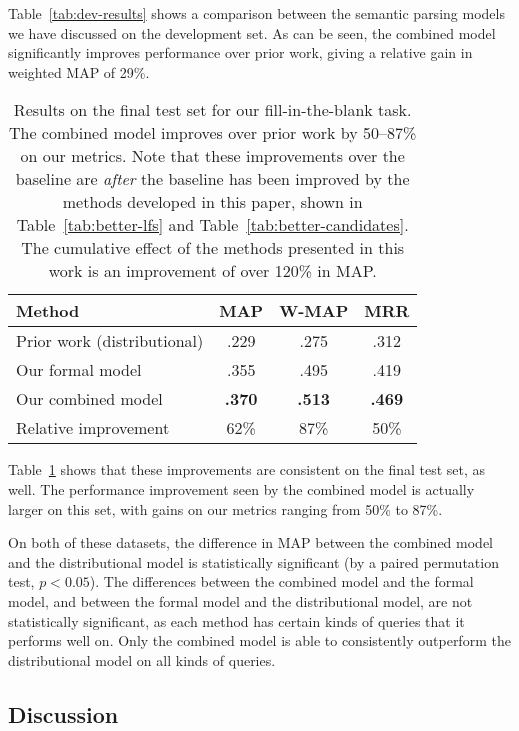 \documentclass[11pt]{article}
\newcommand{\tabref}[1]{Table~\ref{tab:#1}}
\begin{document}
\tabref{dev-results} shows a comparison between the semantic parsing
models we have discussed on the development set.  As can be seen, the
combined model significantly improves performance over prior work,
giving a relative gain in weighted MAP of 29\%.

\begin{table}
  \centering
  {\small
    \begin{tabular}{lccc}
      \toprule
      Method & MAP & W-MAP & MRR \\
      \midrule
      Prior work (distributional) & .229 & .275 & .312 \\
      \midrule
      Our formal model & .355 & .495 & .419 \\
      \midrule
      Our combined model & \textbf{.370} & \textbf{.513} & \textbf{.469} \\
      \midrule
      \midrule
      Relative improvement & 62\% & 87\% & 50\% \\
      \bottomrule
    \end{tabular}
  }
  \caption{Results on the final test set for our fill-in-the-blank
  task.  The combined model improves over prior work by 50--87\% on
  our metrics.  Note that these improvements over the baseline are
  \emph{after} the baseline has been improved by the methods developed
  in this paper, shown in \tabref{better-lfs} and
  \tabref{better-candidates}.  The cumulative effect of the methods
  presented in this work is an improvement of over 120\% in MAP.}
  \label{tab:final-results}
\end{table}

\tabref{final-results} shows that these improvements are consistent on
the final test set, as well.  The performance improvement seen by the
combined model is actually larger on this set, with gains on our
metrics ranging from 50\% to 87\%.

On both of these datasets, the difference in MAP between the combined
model and the distributional model is statistically significant (by a
paired permutation test, $p < 0.05$).  The differences between the
combined model and the formal model, and between the formal model and
the distributional model, are not statistically significant, as each
method has certain kinds of queries that it performs well on.  Only
the combined model is able to consistently outperform the
distributional model on all kinds of queries.

\subsection{Discussion}
\end{document}
